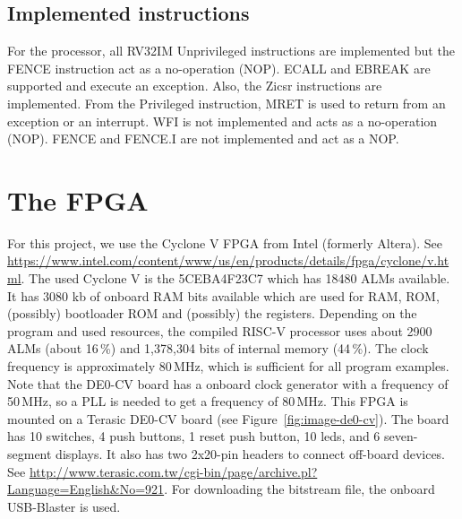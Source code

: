\documentclass[12pt]{article}
\begin{document}
\subsection{Implemented instructions}
For the processor, all RV32IM Unprivileged instructions are implemented but the FENCE instruction act as a no-operation (NOP). ECALL and EBREAK are supported and execute an exception. Also, the Zicsr instructions are implemented. From the Privileged instruction, MRET is used to return from an exception or an interrupt. WFI is not implemented and acts as a no-operation (NOP). FENCE and FENCE.I are not implemented and act as a NOP.

\section{The FPGA}
For this project, we use the Cyclone V FPGA from Intel (formerly Altera). See \url{https://www.intel.com/content/www/us/en/products/details/fpga/cyclone/v.html}.
The used Cyclone V is the 5CEBA4F23C7 which has 18480 ALMs available. It has 3080 kb of onboard RAM bits available which are used for RAM, ROM, (possibly) bootloader ROM and (possibly) the registers. Depending on the program and used resources, the compiled RISC-V processor uses about 2900 ALMs (about 16\,\%) and 1,378,304 bits of internal memory (44\,\%). The clock frequency is approximately 80\,MHz, which is sufficient for all program examples. Note that the DE0-CV board has a onboard clock generator with a frequency of 50\,MHz, so a PLL is needed to get a frequency of 80\,MHz. This FPGA is mounted on a Terasic DE0-CV board (see Figure~\ref{fig:image-de0-cv}). The board has 10 switches, 4 push buttons, 1 reset push button, 10 leds, and 6 seven-segment displays. It also has two 2x20-pin headers to connect off-board devices. See \url{http://www.terasic.com.tw/cgi-bin/page/archive.pl?Language=English&No=921}. For downloading the bitstream file, the onboard USB-Blaster is used.
\end{document}
